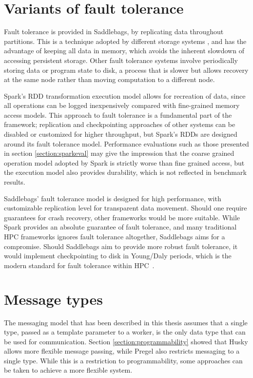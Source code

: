 \documentclass{uit-report}
\begin{document}

\section{Variants of fault tolerance}
Fault tolerance is provided in Saddlebags, by replicating data throughout partitions. This is a technique adopted by different storage systems \cite{dynamo, ramcloud, chord}, and has the advantage of keeping all data in memory, which avoids the inherent slowdown of accessing persistent storage. Other fault tolerance systems involve periodically storing data or program state to disk, a process that is slower but allows recovery at the same node rather than moving computation to a different node.

Spark's RDD transformation execution model allows for recreation of data, since all operations can be logged inexpensively compared with fine-grained memory access models. This approach to fault tolerance is a fundamental part of the framework; replication and checkpointing approaches of other systems can be disabled or customized for higher throughput, but Spark's RDDs are designed around its fault tolerance model. Performance evaluations such as those presented in section \ref{section:sparkeval} may give the impression that the coarse grained operation model adopted by Spark is strictly worse than fine grained access, but the execution model also provides durability, which is not reflected in benchmark results. 

Saddlebags' fault tolerance model is designed for high performance, with customizable replication level for transparent data movement. Should one require guarantees for crash recovery, other frameworks would be more suitable. While Spark provides an absolute guarantee of fault tolerance, and many traditional HPC frameworks ignores fault tolerance altogether, Saddlebags aims for a compromise. Should Saddlebags aim to provide more robust fault tolerance, it would implement checkpointing to disk in Young/Daly periods, which is the modern standard for fault tolerance within HPC~\cite{herault2016fault}.

\section{Message types}
The messaging model that has been described in this thesis assumes that a single type, passed as a template parameter to a worker, is the only data type that can be used for communication. Section \ref{section:programmability} showed that Husky allows more flexible message passing, while Pregel also restricts messaging to a single type. While this is a restriction to programmability, some approaches can be taken to achieve a more flexible system. 
\end{document}
